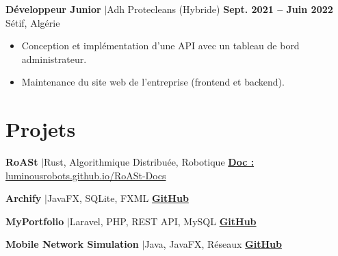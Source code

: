 \documentclass[a4paper,10pt]{article}
\begin{document}
\vspace{2pt}

\textbf{Développeur Junior} \enspace$|$\enspace \textcolor{textgray}{Adh Protecleans (Hybride)} \hfill \textbf{Sept. 2021 -- Juin 2022}\\
\textcolor{textgray}{Sétif, Algérie}
\begin{itemize}
    \item Conception et implémentation d'une API avec un tableau de bord administrateur.
    \item Maintenance du site web de l'entreprise (frontend et backend).
\end{itemize}

\section{Projets}

\noindent\textbf{RoASt} \enspace$|$\enspace \textcolor{textgray}{Rust, Algorithmique Distribuée, Robotique} \hfill \href{https://luminousrobots.github.io/RoASt-Docs/pages/overview.html}{\textbf{Doc :} \textcolor{textgray}{\small luminousrobots.github.io/RoASt-Docs}}\par
{}\par
\vspace{2.5pt}

\noindent\textbf{Archify} \enspace$|$\enspace \textcolor{textgray}{JavaFX, SQLite, FXML} \hfill \href{https://github.com/OussamaNahnah/Archify}{\textbf{GitHub}}\par
{}\par
\vspace{2.5pt}

\noindent\textbf{MyPortfolio} \enspace$|$\enspace \textcolor{textgray}{Laravel, PHP, REST API, MySQL} \hfill \href{https://github.com/OussamaNahnah/MyPortfolio}{\textbf{GitHub}}\par
{}\par
\vspace{2.5pt}

\noindent\textbf{Mobile Network Simulation} \enspace$|$\enspace \textcolor{textgray}{Java, JavaFX, Réseaux} \hfill \href{https://github.com/OussamaNahnah/Mobile-Network-Simulation}{\textbf{GitHub}}\par
{}\par
\vspace{2.5pt}
\end{document}
